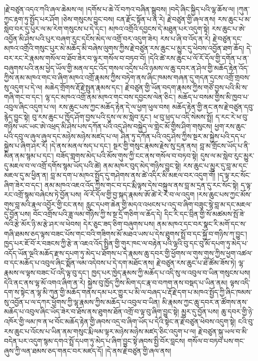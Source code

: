 \documentclass{article}
\begin{document}
།རྗེ་བཙུན་འདའ་ཀའི་ཞལ་ཆེམས་ལ། །དགོས་པ་ཆེ་འོ་བཀའ་བཞིན་སྒྲུབས། །བདེ་ཞིང་སྐྱིད་པའི་ལྷ་ཆོས་ལ། །ཀུན་ཀྱང་རྟག་ཏུ་སྤྱོད་པར་ཤོག །ཅེས་གསུངས་བྱུང་བས། ངན་རྫོང་སྟོན་པ་ན་རེ། རྗེ་བཙུན་གྱི་ཞལ་ནས། རས་ཆུང་པ་མ་སླེབ་བར་དུ་པུར་ལ་མ་རེག་གསུངས་པ་དེ་དང་། མཁའ་འགྲོའི་དབྱངས་དེ་མཐུན་པར་འདུག་སྟེ། རས་ཆུང་པ་ཨེ་འབྱོན་མི་ཤེས་པའི་པུར་བཞག་རུང་དངོས་མེད་ལ་འགྲོ་བར་འདུག་ཟེར། རས་པ་ཞི་བ་འོད་ན་རེ། རྗེ་བཙུན་དང་མཁའ་འགྲོའི་གསུང་པུར་མེ་མཆོད་མི་བཞེས་ལུགས་ཀྱིས་རྗེ་བཙུན་རས་ཆུང་པ་མྱུར་དུ་ཕེབས་འབྱོན་ཐག་ཆོད། དེ་བར་རང་རེ་རྣམས་གསོལ་བ་ཐོབ་ཟེར་བ་ལྟར་གསོལ་བ་བཏབ་བོ། །དེའི་ཚེ་རས་ཆུང་པ་ལོ་རོ་དོལ་གྱི་དགོན་པ་ན་བཞུགས་པའི་ནམ་ཕྱེད་ཡོལ་གྱི་མནལ་དང་འོད་གསལ་འདྲེས་པའི་ཉམས་ལ་ཆུ་དབར་ན་ཤེལ་གྱི་མཆོད་རྟེན་འོད་ཀྱིས་ནམ་མཁའ་གང་བ་ཞིག་མཁའ་འགྲོ་རྣམས་ཀྱིས་བཏེག་ནས་ཞིང་ཁམས་གཞན་དུ་གདན་དྲངས་འགྲོ་གྲབས་སུ་འདུག་པ་དེ་ལ། མཆེད་གྲོགས་རྡོ་རྗེ་སྤུན་རྣམས་དང་། རྗེ་བཙུན་གྱི་ཡོན་བདག་རྣམས་ཀྱིས་གཙོ་བྱས་པའི་མི་ས་གཞི་གང་བ་དང་། ལྷ་དང་མཁའ་འགྲོ་ནམ་མཁའ་གང་བས་དབྱངས་ལེན་ཅིང་། མཆོད་པ་བསམ་གྱིས་མི་ཁྱབ་པ་འབུལ་ཞིང་འདུག་པ་ལ། རས་ཆུང་པས་ཀྱང་མཆོད་རྟེན་དེ་ལ་ཕྱག་ཕུལ་བས། མཆོད་རྟེན་གྱི་ནང་ནས་རྗེ་བཙུན་དབུ་རྙེད་བྱུང་སྟེ། བུ་རས་ཆུང་པ་ཁྱོད་ཤོག་བྱས་པའི་དུས་ལ་མ་སླེབ་རུང་། ཕ་བུ་ཕྲད་པ་འདི་སེམས་སྤྲོ། ད་རང་རེ་ཕ་བུ་གཉིས་ཡང་ཡང་ཨེ་འཕྲད་མི་ཤེས་པས་དཀོན་པའི་འདུ་ཤེས་བསྐྱེད་ལ་གླེང་མོ་གྱིས་ཤིག་གསུངས། ཕྱག་རས་ཆུང་པའི་དབུ་ལ་ཞུལ་ཞུལ་དང་མཉེས་མཉེས་མཛད་པ་ལ། ཤིན་ཏུ་དཀོན་པའི་འདུ་ཤེས་ཀྱིས་སྔར་མ་སྐྱེས་པའི་དད་པ་སྐྱེས་པ་ཞིག་ཤར་རོ། །དེ་ནས་མནལ་སད་པ་དང་། སྔར་གྱི་གསུང་རྣམས་རྗེས་སུ་དྲན་ནས། བླ་མ་གྲོངས་ཡོད་པ་ནི་མིན་ནམ་སྙམ་པ་དང་། བཟོད་གླགས་མེད་པའི་མོས་གུས་ཀྱི་ངང་ནས་གསོལ་བ་བཏབ་སྟེ། དུས་ལ་མ་སླེབ་རུང་མྱུར་དུ་མཇལ་བ་ལ་འགྲོ་དགོས་སྙམ་ཡོད་པའི་ཚེ། ནམ་མཁར་བུད་མེད་གཉིས་བྱུང་སྟེ། རས་ཆུང་པ་མྱུར་དུ་བླ་མ་དང་མཇལ་དུ་མ་ཕྱིན་ན། བླ་མ་དག་པ་མཁའ་སྤྱོད་དུ་གཤེགས་ནས་ཚེ་འདིར་མི་མཇལ་བར་འདུག་གོ། །ད་ལྟ་རང་སོང་ཞིག་ཟེར་བ་དང་། ནམ་མཁའ་འཇའ་འོད་ཀྱིས་གང་བ་དང་རྨི་ལྟས་དེས་བསྐུལ་ནས་བླ་མ་དྲན་དུ་རང་སོང་སྟེ། ད་ལྟ་རང་འགྲོ་སྙམ་བཞེངས་ཏེ་བྱོན་པས། ལོ་རོ་དོལ་གྱི་བྱ་སྐད་རྣམས་ཨོ་ཚེ་རེ་རེ་བ་ལ་འདུག །རས་ཆུང་པས་ཀྱང་མོས་གུས་བླ་མའི་རྣལ་འབྱོར་གྱི་ངང་ནས། རླུང་དཔག་ཆེན་གྱི་མདའ་འཕངས་པ་འདྲ་བ་ཞིག་བཟུང་སྙེ་བླ་མ་དང་མཇལ་དུ་བྱོན་པས། བོང་འགྲོས་པའི་ཟླ་ལམ་གཉིས་ཀྱི་ས་སྔ་དྲོ་གཅིག་ལ་ཆོད་དེ། དིང་རི་དང་བྲིན་གྱི་སོ་མཚམས་སྤོ་ཟེ་ལའི་རྩེ་མོར་ཉི་མ་རྩེ་ཤར་ལ་ཕེབས། དེར་ཅུང་ཟད་ཅིག་བཞུགས་པས། ནམ་མཁའ་དང་བར་སྣང་རི་མགོ་དང་ས་གཞི་ཐམས་ཅད་ལྟས་བཟང་པོས་གང་བའི་གཟིགས་མོ་མཐའ་ཡས་པ་དེས་ཐུགས་སྤྲོ་བ་དང་སྐྱོ་བ་གཉིས་ཀ་བྱུང་། ཁྱད་པར་ཇོ་བོ་ར་བཟངས་ཀྱི་རྩེ་ན་འཇའ་འོད་སྤྲིན་གྱི་གུར་ཁང་ལ་བརྟེན་པའི་ལྷའི་བུ་དང་བུ་མོ་དཔག་ཏུ་མེད་པ་འདོད་ཡོན་ལྔའི་མཆོད་རྫས་དཔག་ཏུ་མེད་པ་ཐོགས་པ་དེ་རྣམས་ཆུ་དབར་གྱི་ཕྱོགས་ལ་གུས་གུས་ཀྱིས་ཕྱག་འཚལ་བ་དང་མཆོད་པ་འབུལ་ཞིང་སྨོན་ལམ་འདེབས་པ་དེ་དག་མཐོང་ནས། རྗེ་བཙུན་རས་ཆུང་པ་ཐེ་ཚོམ་ཟོས་ཏེ། ལྷ་རྣམས་ལ་ལྟས་བཟང་པོ་འདི་ལྟ་བུ་དང་། ཁྱད་པར་ཁྱེད་རྣམས་ཀྱི་མཆོད་པ་འདི་སུ་ལ་འབུལ་བ་ཡིན་གསུངས་པས། དེའི་ནང་ནས་ལྷ་མོ་འགའ་ཞིག་ན་རེ། སྐྱེས་བུ་ཁྱོད་ཀྱིས་མིག་དང་རྣ་བ་བཀག་ནས་བསྡད་པ་ཡིན་ནམ། ལྟས་འདི་དག་ས་སྟེང་ན་ལྷ་མི་ཀུན་གྱི་མཆོད་གནས་དམ་པར་གྱུར་པ་མི་ལ་བཞད་པ་རྡོ་རྗེ་དག་པ་མཁའ་སྤྱོད་ཀྱི་ཞིང་ཁམས་སུ་འབྱོན་པ་ལ་དཀར་ཕྱོགས་ཀྱི་ལྷ་རྣམས་ཀྱིས་མཆོད་པ་འབུལ་བ་ཡིན། མི་རྣམས་ཀྱང་ཆུ་དབར་ན་ཚོགས་ནས་མཆོད་པ་འབུལ་ཞིང་ཡོད་ཟེར་བ་ཐོས་ནས་ཐུགས་ཐོན་འགྲོ་བ་ལྟ་བུ་ཞིག་བྱུང་སྟེ། མྱུར་དུ་བྱོན་པས། ཆུ་དབར་གྱི་ཉེ་འཁོར་གྱི་ལམ་ཁ་ན་ཕ་བོང་མཆོད་རྟེན་གྱི་ཞབས་འདྲ་བ་ཞིག་ཡོད་པ་དེའི་སྟེང་ན་རྗེ་བཙུན་ཕེབས་འདུག་སྟེ། ངའི་བུ་རས་ཆུང་པ་འོངས་པ་ཡིན་ནམ་གསུང་རྨི་ལམ་ལྟར་མཉེས་མཉེས་མཛད་ཅིང་འདུག་པ་ལ། རྗེ་བཙུན་སྐུ་ཡལ་བ་མི་བདེན་པར་འདུག་སྙམ་དགའ་སྤྲོ་དཔག་ཏུ་མེད་པ་ཞིག་བྱུང་སྟེ་ཞབས་སྤྱི་བོར་བླངས། གསོལ་བ་བཏབ་པས་གང་ཞུས་ཀྱི་ལན་ཐམས་ཅད་གནང་བར་མཛད་དོ། །དེ་ནས་རྗེ་བཙུན་གྱི་ཞལ་ནས། 
\end{document}
